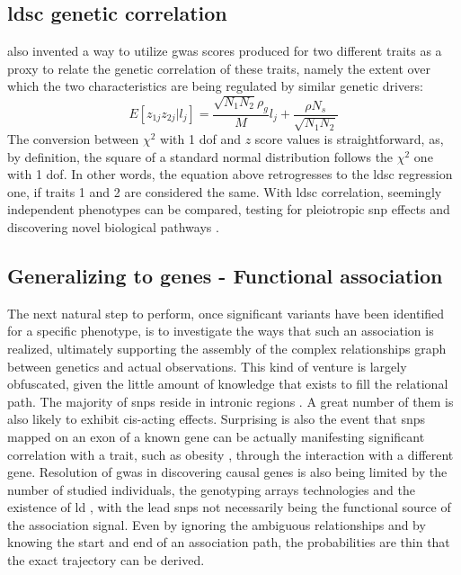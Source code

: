 \subsection{\Ac{ldsc} genetic correlation}
\citet{Bulik-Sullivan2015_cor} also invented a way to utilize \ac{gwas} scores produced for two different traits as a proxy to relate the genetic correlation of these traits, namely the extent over which the two characteristics are being regulated by similar genetic drivers:
$$
E[z_{1j}z_{2j}|l_j] = \frac{\sqrt{N_1N_2}\rho_g}{M}l_j + \frac{\rho N_s}{\sqrt{N_1N_2}}
$$
The conversion between $\chi^2$ with 1 \ac{dof} and $z$ score values is straightforward, as, by definition, the square of a standard normal distribution follows the $\chi^2$ one with 1 \ac{dof}. In other words, the equation above retrogresses to the \ac{ldsc} regression one, if traits 1 and 2 are considered the same. With \ac{ldsc} correlation, seemingly independent phenotypes can be compared, testing for pleiotropic \ac{snp} effects and discovering novel biological pathways \cite{Bulik-Sullivan2015_cor}.

\subsection{Generalizing to genes - Functional association}
The next natural step to perform, once significant variants have been identified for a specific phenotype, is to investigate the ways that such an association is realized, ultimately supporting the assembly of the complex relationships graph between genetics and actual observations. This kind of venture is largely obfuscated, given the little amount of knowledge that exists to fill the relational path. The majority of \acp{snp} reside in intronic regions \cite{Belmont2003}. A great number of them is also likely to exhibit cis-acting effects. Surprising is also the event that \acp{snp} mapped on an exon of a known gene can be actually manifesting significant correlation with a trait, such as obesity \cite{Claussnitzer2015}, through the interaction with a different gene. Resolution of \ac{gwas} in discovering causal genes is also being limited by the number of studied individuals, the genotyping arrays technologies and the existence of \ac{ld} \cite{Do2017}, with the lead \acp{snp} not necessarily being the functional source of the association signal. Even by ignoring the ambiguous relationships and by knowing the start and end of an association path, the probabilities are thin that the exact trajectory can be derived.

